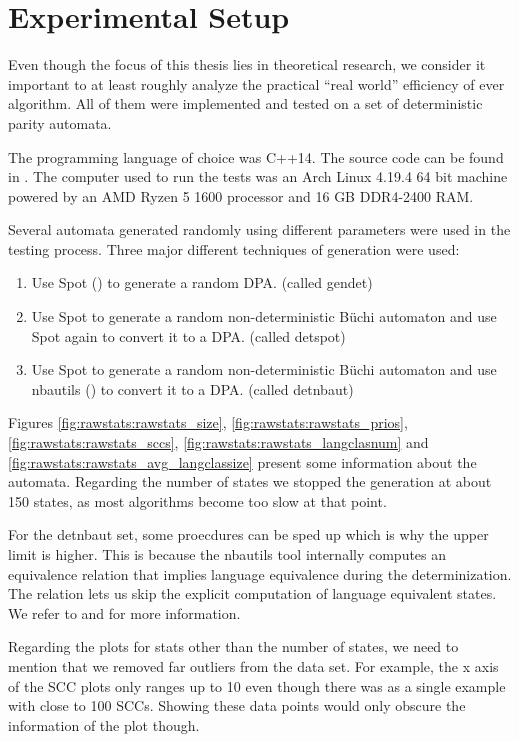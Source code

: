 



\section{Experimental Setup}
Even though the focus of this thesis lies in theoretical research, we consider it important to at least roughly analyze the practical \enquote{real world} efficiency of ever algorithm. All of them were implemented and tested on a set of deterministic parity automata.

The programming language of choice was C++14. The source code can be found in \cite{Tollkoetter2018}. The computer used to run the tests was an Arch Linux 4.19.4 64 bit machine powered by an AMD Ryzen 5 1600 processor and 16 GB DDR4-2400 RAM.

Several automata generated randomly using different parameters were used in the testing process. Three major different techniques of generation were used:

\begin{enumerate}
	\item Use Spot (\cite{duret.16.atva2}) to generate a random DPA. (called \textsf{gendet})
	\item Use Spot to generate a random non-deterministic B\"uchi automaton and use Spot again to convert it to a DPA. (called \textsf{detspot})
	\item Use Spot to generate a random non-deterministic B\"uchi automaton and use nbautils (\cite{Pirogov2018}) to convert it to a DPA. (called \textsf{detnbaut})
\end{enumerate}

Figures \ref{fig:rawstats:rawstats_size}, \ref{fig:rawstats:rawstats_prios}, \ref{fig:rawstats:rawstats_sccs}, \ref{fig:rawstats:rawstats_langclasnum} and \ref{fig:rawstats:rawstats_avg_langclassize} present some information about the automata. Regarding the number of states we stopped the generation at about 150 states, as most algorithms become too slow at that point. 

For the \textsf{detnbaut} set, some proecdures can be sped up which is why the upper limit is higher. This is because the nbautils tool internally computes an equivalence relation that implies language equivalence during the determinization. The relation lets us skip the explicit computation of language equivalent states. We refer to \cite{Schewe2009} and \cite{Piterman2007} for more information.

Regarding the plots for stats other than the number of states, we need to mention that we removed far outliers from the data set. For example, the x axis of the SCC plots only ranges up to 10 even though there was as a single example with close to 100 SCCs. Showing these data points would only obscure the information of the plot though.


